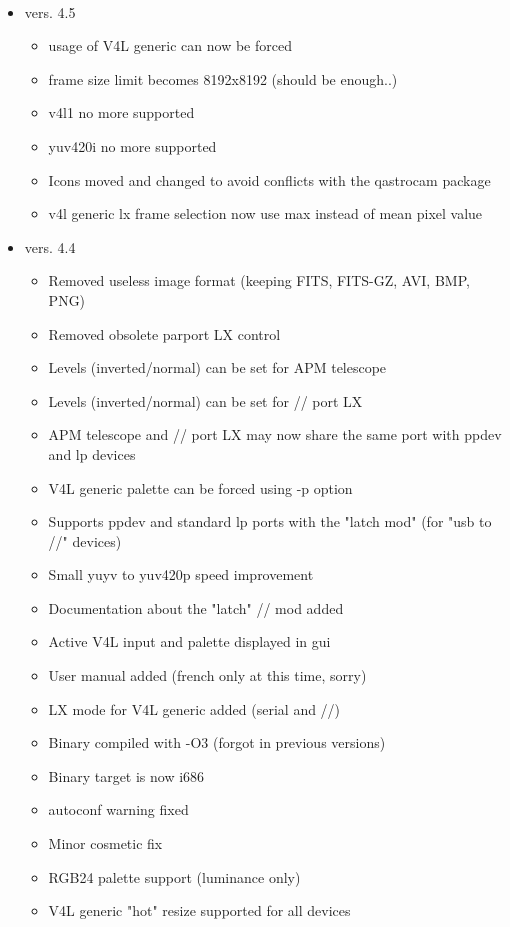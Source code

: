 \documentclass[11pt,a4paper]{book}
\begin{document}
\paragraph*{}
\renewcommand\labelitemi{\textbullet}
\begin{itemize}
\item vers. 4.5
\begin{itemize}
\item usage of V4L generic can now be forced
\item frame size limit becomes 8192x8192 (should be enough..)
\item v4l1 no more supported
\item yuv420i no more supported
\item Icons moved and changed to avoid conflicts with the qastrocam package
\item v4l generic lx frame selection now use max instead of mean pixel value
\end{itemize}
\item vers. 4.4
\begin{itemize}
\item Removed useless image format (keeping FITS, FITS-GZ, AVI, BMP, PNG)
\item Removed obsolete parport LX control
\item Levels (inverted/normal) can be set for APM telescope
\item Levels (inverted/normal) can be set for // port LX
\item APM telescope and // port LX may now share the same port with ppdev and lp devices
\item V4L generic palette can be forced using -p option
\item Supports ppdev and standard lp ports with the "latch mod" (for "usb to //" devices)
\item Small yuyv to yuv420p speed improvement
\item Documentation about the "latch" // mod added
\item Active V4L input and palette displayed in gui
\item User manual added (french only at this time, sorry)
\item LX mode for V4L generic added (serial and //)
\item Binary compiled with -O3 (forgot in previous versions)
\item Binary target is now i686
\item autoconf warning fixed
\item Minor cosmetic fix
\item RGB24 palette support (luminance only)
\item V4L generic "hot" resize supported for all devices
\end{itemize}

\end{itemize}
\end{document}
